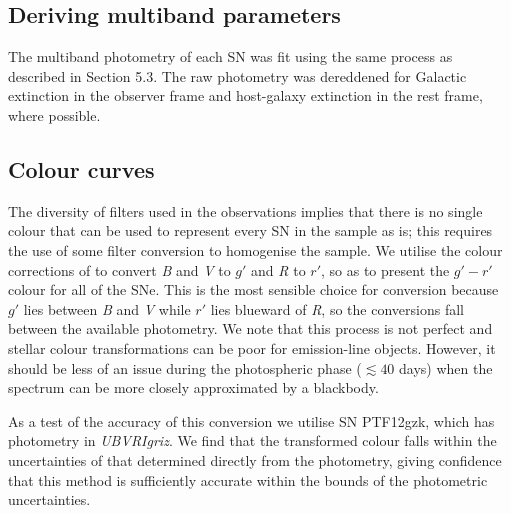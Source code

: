 \documentclass[a4paper,fleqn,usenatbib]{mnras}
\begin{document}
\subsection{Deriving multiband parameters}
The multiband photometry of each SN was fit using the same process as described in Section 5.3. The raw photometry was dereddened for Galactic extinction in the observer frame and host-galaxy extinction in the rest frame, where possible. 

\subsection{Colour curves}
The diversity of filters used in the observations implies that there is no single colour that can be used to represent every SN in the sample as is; this requires the use of some filter conversion to homogenise the sample. We utilise the colour corrections of \cite{Jordi2006} to convert \textit{B} and \textit{V} to $g'$ and \textit{R} to $r'$, so as to present the $g'-r'$ colour for all of the SNe. This is the most sensible choice for conversion because $g'$ lies between \textit{B} and \textit{V} while $r'$ lies blueward of \textit{R}, so the conversions fall between the available photometry. We note that this process is not perfect and stellar colour transformations can be poor for emission-line objects. However, it should be less of an issue during the photospheric phase ($\lesssim 40$ days) when the spectrum can be more closely approximated by a blackbody. 

As a test of the accuracy of this conversion we utilise SN PTF12gzk, which has photometry in \textit{UBVRIgriz}. We find that the transformed colour falls within the uncertainties of that determined directly from the photometry, giving confidence that this method is sufficiently accurate within the bounds of the photometric uncertainties.
\end{document}

